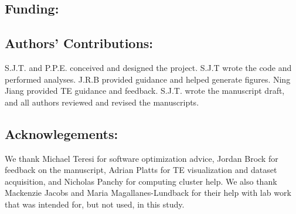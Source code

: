 \documentclass[fleqn,10pt]{olplainarticle}
\begin{document}
\subsection{Funding:}

\subsection{Authors' Contributions:}
S.J.T. and P.P.E. conceived and designed the project.
S.J.T wrote the code and performed analyses.
J.R.B provided guidance and helped generate figures.
Ning Jiang provided TE guidance and feedback.
S.J.T. wrote the manuscript draft, and all authors reviewed and revised the manuscripts.

\subsection{Acknowlegements:}
We thank Michael Teresi for software optimization advice, Jordan Brock for feedback on the manuscript, Adrian Platts for TE visualization and dataset acquisition, and Nicholas Panchy for computing cluster help. We also thank Mackenzie Jacobs and Maria Magallanes-Lundback for their help with lab work that was intended for, but not used, in this study.

\newpage

\end{document}
